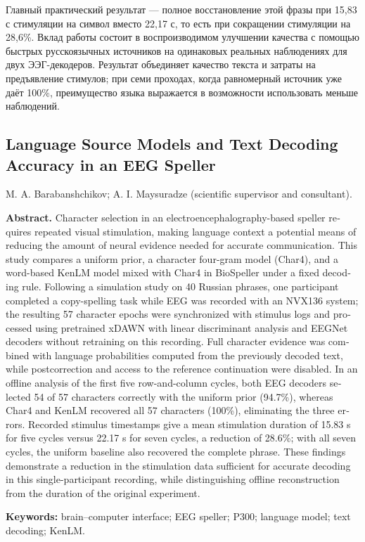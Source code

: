 \documentclass[11pt,a4paper]{article}
\begin{document}
Главный практический результат --- полное восстановление этой фразы при 15,83 с стимуляции на символ вместо 22,17 с, то есть при сокращении стимуляции на 28,6\%. Вклад работы состоит в воспроизводимом улучшении качества с помощью быстрых русскоязычных источников на одинаковых реальных наблюдениях для двух ЭЭГ-декодеров. Результат объединяет качество текста и затраты на предъявление стимулов; при семи проходах, когда равномерный источник уже даёт 100\%, преимущество языка выражается в возможности использовать меньше наблюдений.

\vspace{.4em}

{\small}

\FloatBarrier
\clearpage
\begin{otherlanguage}{english}
\section*{Language Source Models and Text Decoding Accuracy in an EEG Speller}
\noindent M. A. Barabanshchikov; A. I. Maysuradze (scientific supervisor and consultant).

\noindent\textbf{Abstract.} Character selection in an electroencephalography-based speller requires repeated visual stimulation, making language context a potential means of reducing the amount of neural evidence needed for accurate communication. This study compares a uniform prior, a character four-gram model (Char4), and a word-based KenLM model mixed with Char4 in BioSpeller under a fixed decoding rule. Following a simulation study on 40 Russian phrases, one participant completed a copy-spelling task while EEG was recorded with an NVX136 system; the resulting 57 character epochs were synchronized with stimulus logs and processed using pretrained xDAWN with linear discriminant analysis and EEGNet decoders without retraining on this recording. Full character evidence was combined with language probabilities computed from the previously decoded text, while postcorrection and access to the reference continuation were disabled. In an offline analysis of the first five row-and-column cycles, both EEG decoders selected 54 of 57 characters correctly with the uniform prior (94.7\%), whereas Char4 and KenLM recovered all 57 characters (100\%), eliminating the three errors. Recorded stimulus timestamps give a mean stimulation duration of 15.83 s for five cycles versus 22.17 s for seven cycles, a reduction of 28.6\%; with all seven cycles, the uniform baseline also recovered the complete phrase. These findings demonstrate a reduction in the stimulation data sufficient for accurate decoding in this single-participant recording, while distinguishing offline reconstruction from the duration of the original experiment.

\noindent\textbf{Keywords:} brain--computer interface; EEG speller; P300; language model; text decoding; KenLM.
\end{otherlanguage}
\end{document}
